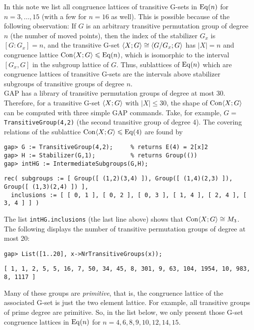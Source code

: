 In this note we list all congruence lattices of transitive G-sets in $\operatorname{Eq}(n)$
for $n=3,\dots, 15$ (with a few for $n=16$ as well).  This is possible because
of the following observation: If $G$ is an arbitrary transitive permutation
group of degree $n$ (the number of moved points), then the index of the
stabilizer $G_x$ is $[G: G_x] = n$, and the transitive G-set $\langle X; G\rangle \cong 
\langle G/G_x; G\rangle$ has $|X|=n$ and congruence lattice $\operatorname{Con}\langle X; G\rangle \leqslant \operatorname{Eq}(n)$,
which is isomorphic to the interval $[G_x, G]$ in the subgroup lattice of $G$.  
Thus, sublattices of $\operatorname{Eq}(n)$ which are congruence lattices of transitive G-sets
are the intervals above stabilizer subgroups of transitive groups of degree $n$.
\\[8pt]
GAP has a library of transitive permutation groups of degree at most 30.
Therefore, for a transitive G-set $\langle X; G\rangle$ with $|X|\leq 30$, the shape of $\operatorname{Con}\langle X;
G\rangle$ can be computed with three simple GAP commands.  Take, for example,
$G=$ {\tt TransitiveGroup(4,2)} (the second transitive group of
degree 4).  The covering relations of the sublattice $\operatorname{Con}\langle X; G\rangle \leqslant \operatorname{Eq}(4)$
are found by
{\small
\begin{verbatim}
gap> G := TransitiveGroup(4,2);     % returns E(4) = 2[x]2
gap> H := Stabilizer(G,1);          % returns Group(())
gap> intHG := IntermediateSubgroups(G,H);
\end{verbatim}
}
{\scriptsize
\begin{verbatim}
rec( subgroups := [ Group([ (1,2)(3,4) ]), Group([ (1,4)(2,3) ]), Group([ (1,3)(2,4) ]) ], 
  inclusions := [ [ 0, 1 ], [ 0, 2 ], [ 0, 3 ], [ 1, 4 ], [ 2, 4 ], [ 3, 4 ] ] )
\end{verbatim}
}
\noindent The list {\tt intHG.inclusions} (the last line above) shows that $\operatorname{Con}\langle X; G\rangle \cong M_3$.
\\[6pt]
The following displays the number of transitive permutation groups of degree at
most 20: 
{\small
\begin{verbatim}
gap> List([1..20], x->NrTransitiveGroups(x));
\end{verbatim}
}
{\scriptsize
\begin{verbatim}
[ 1, 1, 2, 5, 5, 16, 7, 50, 34, 45, 8, 301, 9, 63, 104, 1954, 10, 983, 8, 1117 ]
\end{verbatim}}
\noindent Many of these groups are \emph{primitive}, that is, the congruence
lattice of the associated G-set is just the two element lattice.  For example,
all transitive groups of prime degree are primitive.  So, in the list below, we
only present those G-set congruence lattices in $\operatorname{Eq}(n)$ for $n=4, 6, 8, 9,
10, 12, 14, 15$. 

